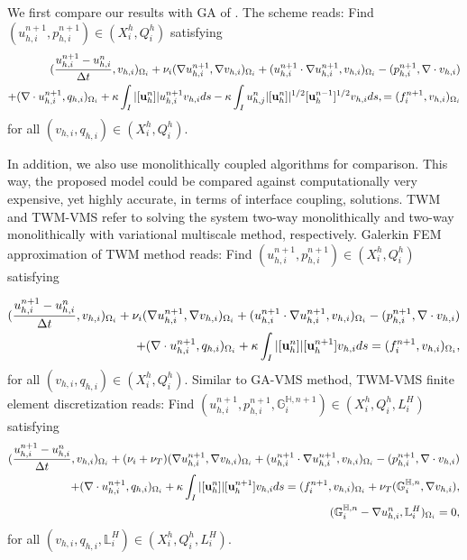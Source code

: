 \documentclass[10pt]{article}%
\numberwithin{equation}{section}
\newcommand{\bff}{{  f}}
\newcommand{\bX}{{X }}
\begin{document}
We first compare our results with GA of \cite{CHL12}. The scheme reads: Find $(u_{h,i}^{n+1},p_{h,i}^{n+1})\in (X_{i}^h,Q_{i}^h)$ satisfying
\begin{eqnarray}
(\frac{{u^{n+1}_{h,i}}-u_{h,i}^{n}}{\Delta t} ,v_{h,i})_{\Omega_i} +\nu_i(\nabla  u_{h,i}^{n+1},\nabla v_{h,i})_{\Omega_i}
+({u}_{h,i}^{n+1}\cdot \nabla {u}_{h,i}^{n+1},v_{h,i})_{\Omega_i} \nonumber
-(p_{h,i}^{n+1},\nabla \cdot v_{h,i}) \nonumber\\
+(\nabla\cdot {u}_{h,i}^{n+1},q_{h,i})_{\Omega_i}
+\kappa \int_{I}|[{\bf u}_h^n]|u_{h,i}^{n+1}v_{h,i}ds
-\kappa \int_{I}u_{h,j}^n|[{\bf u}_h^n]|^{1/2}[{\bf u}_h^{n-1}]^{1/2}v_{h,i}ds,
=(\bff_i^{n+1},v_{h,i})_{\Omega_i}\label{algg3}
\end{eqnarray}
for all $(v_{h,i},q_{h,i}) \in (X_{i}^h,Q_{i}^h)$.

In addition, we also use monolithically coupled algorithms for comparison. This way, the proposed model could be compared against computationally very expensive, yet highly accurate, in terms of interface coupling, solutions. TWM and TWM-VMS refer to solving the system two-way monolithically and two-way monolithically with variational multiscale method, respectively. Galerkin FEM approximation of TWM method reads: Find $(u_{h,i}^{n+1},p_{h,i}^{n+1})\in (X_{i}^h,Q_{i}^h)$ satisfying

\begin{eqnarray}
(\frac{{u^{n+1}_{h,i}}-u_{h,i}^{n}}{\Delta t} ,v_{h,i})_{\Omega_i} +
\nu_i(\nabla  {u}_{h,i}^{n+1},\nabla v_{h,i})_{\Omega_i}
+({u}_{h,i}^{n+1}\cdot \nabla {u}_{h,i}^{n+1},v_{h,i})_{\Omega_i}
-(p_{h,i}^{n+1},\nabla \cdot v_{h,i}) \nonumber
\\
+(\nabla\cdot {u}_{h,i}^{n+1},q_{h,i})_{\Omega_i}
+\kappa \int_{I}|[ {\bf u}_h^n]|[{\bf u}_h^{n+1}]v_{h,i}ds
=(\bff_i^{n+1},v_{h,i})_{\Omega_i},\label{BE2}
\end{eqnarray}
for all $(v_{h,i},q_{h,i}) \in (\bX_{i}^h,Q_{i}^h)$.
Similar to GA-VMS method, TWM-VMS finite element discretization reads: Find $(u_{h,i}^{n+1},p_{h,i}^{n+1},\mathbb{G}_i^{\mathbb{H},{n+1}})\in (X_{i}^h,Q_{i}^h,L_i^H)$ satisfying
\begin{eqnarray}
(\frac{{u^{n+1}_{h,i}}-u_{h,i}^{n}}{\Delta t} ,v_{h,i})_{\Omega_i} +(\nu_i+\nu_T)(\nabla  {u}_{h,i}^{n+1},\nabla v_{h,i})_{\Omega_i} + ({u}_{h,i}^{n+1}\cdot \nabla {u}_{h,i}^{n+1},v_{h,i})_{\Omega_i}-(p_{h,i}^{n+1},\nabla \cdot v_{h,i}) \nonumber
\\
 +(\nabla\cdot {u}_{h,i}^{n+1},q_{h,i})_{\Omega_i}+\kappa \int_{I}|[{\bf u}_h^n]|[{\bf u}_h^{n+1}]v_{h,i}ds
=(\bff_i^{n+1},v_{h,i})_{\Omega_i}+\nu_T(\mathbb{G}_i^{\mathbb{H},n},\nabla v_{h,i}), \label{BE3}\\
(\mathbb{G}_i^{\mathbb{H},n}-\nabla u_{h,i}^n, \mathbb{L}_i^H)_{\Omega_i}=0, \label{algg2}
\end{eqnarray}
for all $(v_{h,i},q_{h,i},\mathbb{L}_i^H) \in (\bX_{i}^h,Q_{i}^h,L_i^H)$.
\end{document}
